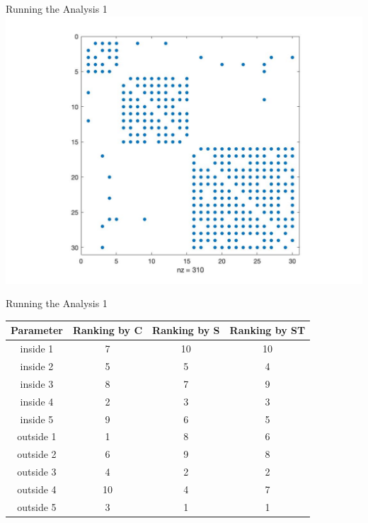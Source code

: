 \documentclass{beamer}
\begin{document}
\begin{frame}{Running the Analysis 1}
\includegraphics[width=\textwidth]{spy3.jpg}
\end{frame}

\begin{frame}{Running the Analysis 1}
	\centering
\begin{tabular}{|c|c|c|c|}
	\hline
	Parameter & Ranking by C & Ranking by S & Ranking by ST \\
	\hline
	inside 1 & 7 & 10 & 10 \\
	\hline
	inside 2 & 5 & 5 & 4 \\
	\hline
	inside 3 & 8 & 7 & 9 \\
	\hline
	inside 4 & 2 & 3 & 3 \\
	\hline
	inside 5 & 9 & 6 & 5 \\
	\hline
	outside 1 & 1 & 8 & 6 \\
	\hline
	outside 2 & 6 & 9 & 8 \\
	\hline
	outside 3 & 4 & 2 & 2 \\
	\hline
	outside 4 & 10 & 4 & 7 \\
	\hline
	outside 5 & 3 & 1 & 1 \\
	\hline
\end{tabular}
\end{frame}
\end{document}
